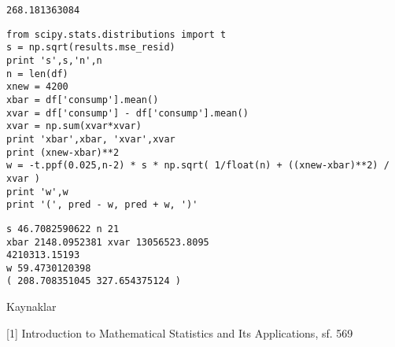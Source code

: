 \documentclass[12pt,fleqn]{article}\usepackage{../common}
\begin{document}
\begin{verbatim}
268.181363084
\end{verbatim}

\begin{verbatim}
from scipy.stats.distributions import t
s = np.sqrt(results.mse_resid)
print 's',s,'n',n
n = len(df)
xnew = 4200
xbar = df['consump'].mean()
xvar = df['consump'] - df['consump'].mean()
xvar = np.sum(xvar*xvar)
print 'xbar',xbar, 'xvar',xvar
print (xnew-xbar)**2
w = -t.ppf(0.025,n-2) * s * np.sqrt( 1/float(n) + ((xnew-xbar)**2) / xvar )
print 'w',w
print '(', pred - w, pred + w, ')'
\end{verbatim}

\begin{verbatim}
s 46.7082590622 n 21
xbar 2148.0952381 xvar 13056523.8095
4210313.15193
w 59.4730120398
( 208.708351045 327.654375124 )
\end{verbatim}


Kaynaklar

[1] Introduction to Mathematical Statistics and Its Applications, sf. 569
\end{document}
